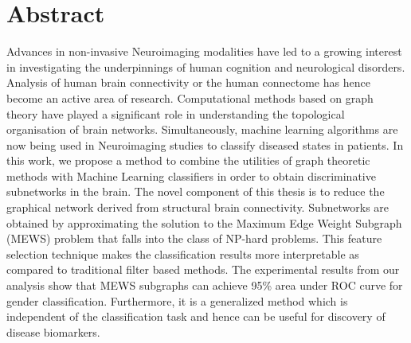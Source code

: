 \documentclass[msthesis.tex]{subfiles}
\begin{document}
\chapter{Abstract}
\thispagestyle{empty}

Advances in non-invasive Neuroimaging modalities have led to a growing interest in investigating the underpinnings of human cognition and neurological disorders. Analysis of human brain connectivity or the human connectome has hence become an active area of research. Computational methods based on graph theory have played a significant role in understanding the topological organisation of brain networks. Simultaneously, machine learning algorithms are now being used in Neuroimaging studies to classify diseased states in patients. In this work, we propose a method to combine the utilities of graph theoretic methods with Machine Learning classifiers in order to obtain discriminative subnetworks in the brain. The novel component of this thesis is to reduce the graphical network derived from structural brain connectivity. Subnetworks are obtained by approximating the solution to the Maximum Edge Weight Subgraph (MEWS) problem that falls into the class of NP-hard problems. This feature selection technique makes the classification results more interpretable as compared to traditional filter based methods. The experimental results from our analysis show that MEWS subgraphs can achieve 95\% area under ROC curve for gender classification. Furthermore, it is a generalized method which is independent of the classification task and hence can be useful for discovery of disease biomarkers.
\end{document}
